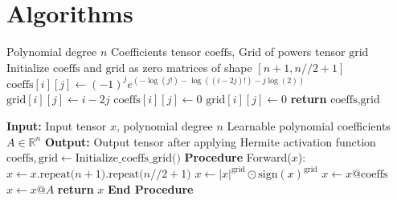 \documentclass{article} %
\theoremstyle{plain}
\theoremstyle{definition}
\theoremstyle{remark}
\begin{document}
\section{Algorithms}
\label{appendix:algorithms}
\begin{algorithm}[!htbp]
   \caption{Initialization of Hermite Grid and Coefficients}
   \label{alg:init_grid}
\begin{algorithmic}
    Polynomial degree $n$
    Coefficients tensor $\text{coeffs}$, Grid of powers tensor $\text{grid}$
   \STATE 
   \STATE Initialize $\text{coeffs}$ and $\text{grid}$ as zero matrices of shape $[n+1, n//2 + 1]$
            \STATE $\text{coeffs}[i][j] \leftarrow (-1)^j e^{\left( - \log(j!) - \log((i - 2 j)!)  - j \log(2)\right)} $
            \STATE $\text{grid}[i][j] \leftarrow i - 2 j$
         \ELSE
            \STATE $\text{coeffs}[i][j] \leftarrow 0$
            \STATE $\text{grid}[i][j] \leftarrow 0$
         \ENDIF
      \ENDFOR
   \ENDFOR
   \STATE \textbf{return} $\text{coeffs}, \text{grid}$
\end{algorithmic}
\end{algorithm}
\begin{algorithm}[!htbp]
   \caption{Hermite Activation Function Forward Pass}
   \label{alg:hermite_forward}
   \begin{algorithmic}
      \STATE \textbf{Input:} Input tensor $x$, polynomial degree $n$
        Learnable polynomial coefficients $A \in \mathbb{R}^n$      
      \STATE \textbf{Output:} Output tensor after applying Hermite activation function
      \STATE 
      \STATE $\text{coeffs}, \text{grid} \leftarrow  \text{Initialize\_coeffs\_grid()}$
      \STATE \textbf{Procedure} Forward($x$):
      \STATE \quad $x \leftarrow x.\text{repeat($n+1$).repeat($n//2+1$)}$
      \STATE \quad $x \leftarrow |x|^{\text{grid}} \odot \text{sign}(x)^{\text{grid}}$
      \STATE \quad $x \leftarrow x @ \text{coeffs}$
      \STATE \quad $x \leftarrow x @ A$
      \STATE \quad \textbf{return} $x$
      \STATE \textbf{End Procedure}
   \end{algorithmic}
\end{algorithm}
\end{document}
